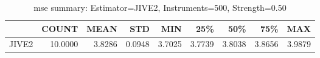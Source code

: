 \begin{table}[ht]
\centering
\caption{mse summary: Estimator=JIVE2, Instruments=500, Strength=0.50}
\begin{tabular}{lrrrrrrrr}
\toprule
 & COUNT & MEAN & STD & MIN & 25\% & 50\% & 75\% & MAX \\
\midrule
JIVE2 & 10.0000 & 3.8286 & 0.0948 & 3.7025 & 3.7739 & 3.8038 & 3.8656 & 3.9879 \\
\bottomrule
\end{tabular}
\end{table}
